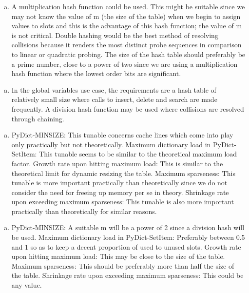 \documentclass[12pt]{article}
\begin{document}
\begin{enumerate}[(c)]

\item
A multiplication hash function could be used. This might be suitable since we may not know the value of m (the size of the table) when we begin to assign values to slots and this is the advantage of this hash function; the value of m is not critical.
Double hashing would be the best method of resolving collisions because it renders the most distinct probe sequences in comparison to linear or quadratic probing.
The size of the hash table should preferably be a prime number, close to a power of two since we are using a multiplication hash function where the lowest order bits are significant.

\end{enumerate}

\begin{enumerate}[(d)]

\item
In the global variables use case, the requirements are a hash table of relatively small size where calls to insert, delete and search are made frequently. A division hash function may be used where collisions are resolved through chaining.

\end{enumerate}

\begin{enumerate}[(e)]

\item
PyDict-MINSIZE: This tunable concerns cache lines which come into play only practically but not theoretically.
Maximum dictionary load in PyDict-SetItem: This tunable seems to be similar to the theoretical maximum load factor.
Growth rate upon hitting maximum load: This is similar to the theoretical limit for dynamic resizing the table.
Maximum sparseness: This tunable is more important practically than theoretically since we do not consider the need for freeing up memory per se in theory.
Shrinkage rate upon exceeding maximum sparseness: This tunable is also more important practically than theoretically for similar reasons.

\end{enumerate}

\begin{enumerate}[(f)]

\item
PyDict-MINSIZE: A suitable m will be a power of 2 since a division hash will be used.
Maximum dictionary load in PyDict-SetItem: Preferably between 0.5 and 1 so as to keep a decent proportion of used to unused slots.
Growth rate upon hitting maximum load: This may be close to the size of the table.
Maximum sparseness: This should be preferably more than half the size of the table.
Shrinkage rate upon exceeding maximum sparseness: This could be any value.

\end{enumerate}
\end{document}
